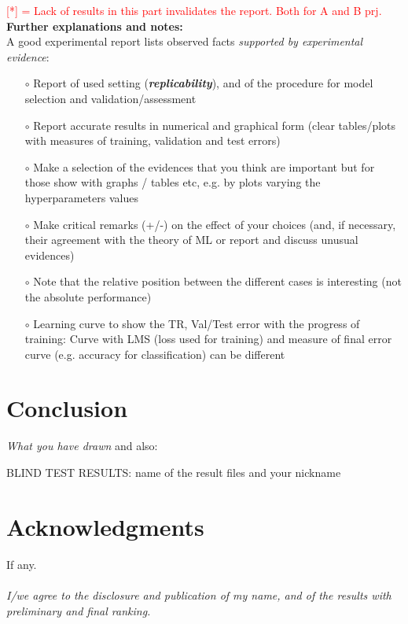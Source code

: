 \documentclass[12pt, letterpaper]{article}  %
\begin{document}
\textcolor{red}{[*] = Lack of results in this part invalidates the report. Both for A and B prj.} \\
\textbf{Further explanations and notes:} \\
A good experimental report lists observed facts \textit{supported by experimental evidence}:
\begin{itemize}
    \setlength\itemsep{-0.25em}
    \item[$\circ$] Report of used  setting (\textbf{\textit{replicability}}), and of the procedure for model selection and validation/assessment
    \item[$\circ$] Report accurate results in numerical and graphical form (clear tables/plots with measures of training, validation and test errors)
    \item[$\circ$] Make a selection of the evidences that you think are important but for those  show with graphs / tables etc, e.g. by plots varying the hyperparameters values
    \item[$\circ$] Make critical remarks (+/-) on the effect of your choices (and, if necessary, their agreement with the theory of ML or report and discuss unusual evidences)
    \item[$\circ$] Note that the relative position between the different cases is interesting (not the absolute performance)
    \item[$\circ$] Learning curve to show the TR, Val/Test error with the progress of training: Curve with LMS (loss used for training) and measure of final error curve (e.g. accuracy for classification) can be different
 
\end{itemize}

         
        
\section{Conclusion}
\textit{What you have drawn} and also:

BLIND TEST RESULTS: name of the result files  and your nickname

\section*{Acknowledgments}
If any. \\ \\

\noindent\textit{I/we agree to the disclosure and publication of my name, and of the results with preliminary and final ranking.}
\end{document}
